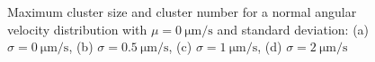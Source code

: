 \documentclass[../../master_thesis_np.tex]{subfiles}
\begin{document}
		\begin{figure}[htp]
			\centering\
			\\
			\\
			
			\caption{Maximum cluster size and cluster number for a normal angular velocity distribution with $\mu = \SI{0}{\um\per\second}$ and standard deviation: (a) $\sigma = \SI{0}{\um\per\second}$, (b) $\sigma = \SI{0.5}{\um\per\second}$, (c) $\sigma = \SI{1}{\um\per\second}$, (d) $\sigma = \SI{2}{\um\per\second}$}
			\label{fig:lj_av_clust}
		\end{figure}
		
\end{document}
